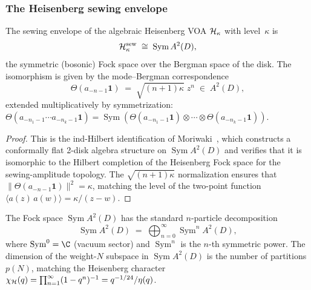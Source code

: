 \subsubsection{The Heisenberg sewing envelope}

\begin{proposition}[Heisenberg sewing envelope = $\operatorname{Sym} A^2(D)$;
\ClaimStatusProvedElsewhere{} Moriwaki~\cite{Moriwaki26b}]%
%
%
The sewing envelope of the algebraic Heisenberg VOA
$\mathcal{H}_\kappa$ with level~$\kappa$ is
\begin{equation}%
\cH_\kappa^{\mathrm{sew}}
\;\cong\;
\operatorname{Sym} A^2(D),
\end{equation}
the symmetric (bosonic) Fock space over the Bergman space of
the disk. The isomorphism is given by the mode--Bergman
correspondence
\begin{equation}%
\Theta(a_{-n-1}\mathbf{1})
\;=\;
\sqrt{(n+1)\kappa}\; z^n
\;\in\; A^2(D),
\end{equation}
extended multiplicatively by symmetrization:
$\Theta(a_{-n_1-1} \cdots a_{-n_k-1}\mathbf{1})
= \operatorname{Sym}(\Theta(a_{-n_1-1}\mathbf{1})
\otimes \cdots \otimes
\Theta(a_{-n_k-1}\mathbf{1}))$.
\end{proposition}

\begin{proof}
This is the ind-Hilbert identification of
Moriwaki~\cite{Moriwaki26b}, which constructs a conformally
flat 2-disk algebra structure on $\operatorname{Sym} A^2(D)$
and verifies that it is isomorphic to the Hilbert completion
of the Heisenberg Fock space for the sewing-amplitude topology.
The $\sqrt{(n+1)\kappa}$ normalization ensures that
$\|\Theta(a_{-n-1}\mathbf{1})\|^2 = \kappa$, matching the
level of the two-point function
$\langle a(z)\,a(w)\rangle = \kappa/(z-w)$.
\end{proof}

\begin{remark}%
The Fock space $\operatorname{Sym} A^2(D)$ has the standard
$n$-particle decomposition
\[
\operatorname{Sym} A^2(D)
\;=\;
\bigoplus_{n=0}^{\infty}
\operatorname{Sym}^n A^2(D),
\]
where $\operatorname{Sym}^0 = \C$ (vacuum sector) and
$\operatorname{Sym}^n$ is the $n$-th symmetric power.
The dimension of the weight-$N$ subspace in
$\operatorname{Sym} A^2(D)$ is the number of partitions
$p(N)$, matching the Heisenberg character
$\chi_{\mathcal{H}}(q) = \prod_{n=1}^{\infty}(1-q^n)^{-1}
= q^{-1/24}/\eta(q)$.
\end{remark}

